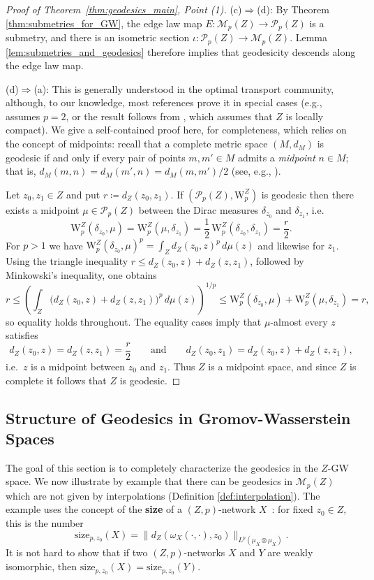 \documentclass{article}
\theoremstyle{definition}
\newcommand{\M}{\mathcal{M}}
\newcommand{\MZp}{\M_p(Z)}
\newcommand{\WZ}{\mathcal{P}_p(Z)}
\newcommand{\wz}{\mathrm{W}_p^Z}
\begin{document}
\begin{proof}[Proof of Theorem~\ref{thm:geodesics_main}, Point (1)]
%

(c)$\Rightarrow$(d): By Theorem \ref{thm:submetries_for_GW}, the edge law map $E:\MZp \to \WZ$ is a submetry, and there is an isometric section $\iota:\WZ \to \MZp$. Lemma \ref{lem:submetries_and_geodesics} therefore implies that geodesicity descends along the edge law map.

(d)$\Rightarrow$(a): This is generally understood in the optimal transport community, although, to our knowledge, most references prove it in special cases (e.g., \cite[Proposition 2.10]{Sturm2006geometryI} assumes $p=2$, or the result follows from \cite[Corollary 7.22]{villani2008optimal}, which assumes that $Z$ is locally compact). We give a self-contained proof here, for completeness, which relies on the concept of midpoints: recall that a complete metric space $(M,d_M)$  is geodesic if and only if every pair of points $m,m' \in M$ admits a \emph{midpoint} $n \in M$; that is, $d_M(m,n) = d_M(m',n) = d_M(m,m')/2$ (see, e.g., \cite[Theorem 2.4.16]{BBI2001}). 
 
 Let $z_0,z_1\in Z$ and put $r\coloneqq d_Z(z_0,z_1)$.
If $(\WZ,\wz)$ is geodesic then there exists a midpoint $\mu\in\WZ$ between the Dirac measures  $\delta_{z_0}$ and $\delta_{z_1}$, i.e.
\[
\wz(\delta_{z_0},\mu)=\wz(\mu,\delta_{z_1})=\frac12\,\wz(\delta_{z_0},\delta_{z_1})=\frac r2.
\]
For $p>1$ we have $\wz(\delta_{z_0},\mu)^p=\int_Z d_Z(z_0,z)^p\,d\mu(z)$ and likewise for $z_1$.
Using the triangle inequality $r\le d_Z(z_0,z)+d_Z(z,z_1)$, followed by Minkowski's inequality, one obtains
\[
r\le \left(\int_Z \bigl(d_Z(z_0,z)+d_Z(z,z_1)\bigr)^p\,d\mu(z)\right)^{1/p}
\le \wz(\delta_{z_0},\mu)+\wz(\mu,\delta_{z_1})=r,
\]
so equality holds throughout.
The equality cases imply that $\mu$-almost every $z$ satisfies
\[
d_Z(z_0,z)=d_Z(z,z_1)=\frac r2
\qquad\text{and}\qquad
d_Z(z_0,z_1)=d_Z(z_0,z)+d_Z(z,z_1),
\]
i.e.\ $z$ is a midpoint between $z_0$ and $z_1$.
Thus $Z$ is a midpoint space, and since $Z$ is complete it follows that $Z$ is geodesic.
\end{proof}

\subsection{Structure of Geodesics in Gromov-Wasserstein Spaces}\label{subsec:geodesic_structure}
    
    The goal of this section is to completely characterize the geodesics in the $Z$-GW space. We now illustrate by example that there can be geodesics in $\MZp$ which are not given by interpolations (Definition \ref{def:interpolation}). The example uses the concept of the \textbf{size} of a $(Z,p)$-network $X$~\cite[Definition 49]{bauer2025zgromovwassersteindistance}: for fixed $z_0 \in Z$, this is the number 
    \begin{equation}\label{eqn:size}
    \mathrm{size}_{p,z_0}(X) = \|d_Z(\omega_X(\cdot,\cdot),z_0)\|_{L^p(\mu_X \otimes \mu_X)}.
    \end{equation}
    It is not hard to show that if two $(Z,p)$-networks $X$ and $Y$ are weakly isomorphic, then $\mathrm{size}_{p,z_0}(X) = \mathrm{size}_{p,z_0}(Y)$.
\end{document}
